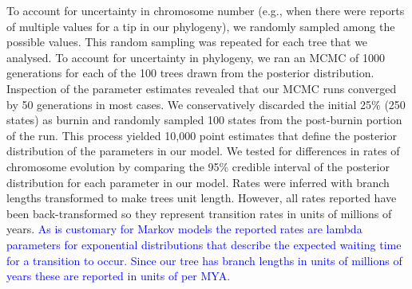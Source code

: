 \documentclass[]{rsos}%
\begin{document}
To account for uncertainty in chromosome number (e.g., when there were reports of multiple values for a tip in our phylogeny), we randomly sampled among the possible values.
This random sampling was repeated for each tree that we analysed.
To account for uncertainty in phylogeny, we ran an MCMC of 1000 generations for each of the 100 trees drawn from the posterior distribution.
Inspection of the parameter estimates revealed that our MCMC runs converged by 50 generations in most cases.  
We conservatively discarded the initial 25\% (250 states) as burnin and randomly sampled 100 states from the post-burnin portion of the run. 
This process yielded 10,000 point estimates that define the posterior distribution of the parameters in our model.
We tested for differences in rates of chromosome evolution by comparing the 95\% credible interval of the posterior distribution for each parameter in our model.
Rates were inferred with branch lengths transformed to make trees unit length.
However, all rates reported have been back-transformed so they represent transition rates in units of millions of years. 
\textcolor{blue}{As is customary for Markov models the reported rates are lambda parameters for exponential distributions that describe the expected waiting time for a transition to occur.
Since our tree has branch lengths in units of millions of years these are reported in units of per MYA.}
\end{document}
